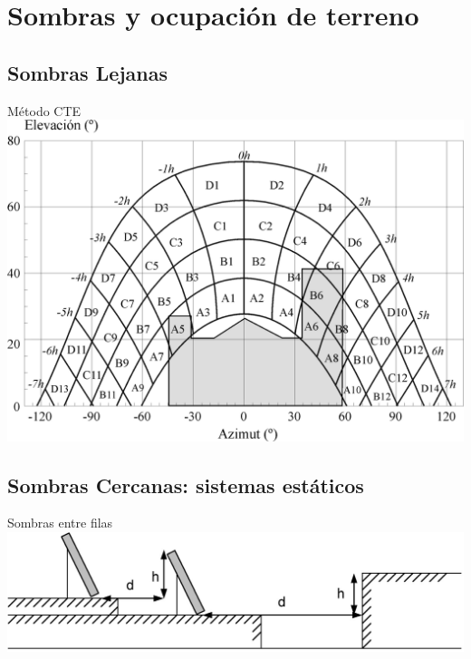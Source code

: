 \documentclass[xcolor={usenames,svgnames,dvipsnames}]{beamer}
\begin{document}
\section{Sombras y ocupación de terreno}
\label{sec-2}

\subsection{Sombras Lejanas}
\label{sec-2-1}

\begin{frame}[label=sec-2-1-1]{Método CTE}
\includegraphics[width=.9\linewidth]{../figs/SombraIES.pdf}
\end{frame}

\subsection{Sombras Cercanas: sistemas estáticos}
\label{sec-2-2}

\begin{frame}[label=sec-2-2-1]{Sombras entre filas}
\includegraphics[width=.9\linewidth]{../figs/SombraEstaticaInclinado2.pdf}
\end{frame}
\end{document}
